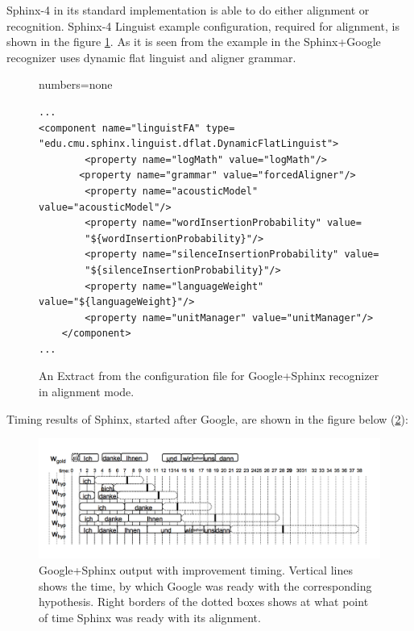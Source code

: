 Sphinx-4 in its standard implementation is able to do either alignment or
recognition. Sphinx-4 Linguist example configuration, required for alignment, is
shown in the figure \ref{fig:conf_al}. As it is seen from the example in the
Sphinx+Google recognizer uses dynamic flat linguist and aligner grammar. 

\begin{figure}[htbp]
  \centering 
 
{numbers=none}  
\lstset{language=XML} 
\begin{lstlisting}[frame=single]
...
<component name="linguistFA" type=
"edu.cmu.sphinx.linguist.dflat.DynamicFlatLinguist">  
        <property name="logMath" value="logMath"/>
       <property name="grammar" value="forcedAligner"/>   
        <property name="acousticModel" value="acousticModel"/>
        <property name="wordInsertionProbability" value=
        "${wordInsertionProbability}"/>
        <property name="silenceInsertionProbability" value=
        "${silenceInsertionProbability}"/>
        <property name="languageWeight" value="${languageWeight}"/>
        <property name="unitManager" value="unitManager"/>
    </component>
...
\end{lstlisting}
 \caption{An Extract from the configuration file for Google+Sphinx recognizer in
 alignment mode.}
  \label{fig:conf_al}
\end {figure}

Timing results of Sphinx, started after Google, are shown in the figure below
(\ref{fig:conf_al_timing}):
\begin{figure}[htbp]
  \centering
    \includegraphics[width=1.0\textwidth]{images/google_sphinx_output_al.png}
 \caption{Google+Sphinx output with improvement timing. Vertical lines shows
 the time, by which Google was ready with the corresponding hypothesis.
 Right borders of the dotted boxes shows at what point of time Sphinx was ready
 with its alignment.}
  \label{fig:conf_al_timing}
\end {figure}

